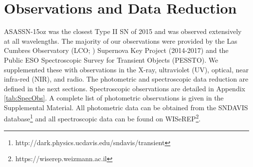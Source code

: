 \documentclass[a4paper,fleqn,usenatbib]{mnras}
\begin{document}
\section{Observations and Data Reduction}  \label{sec:Obs}
ASASSN-15oz was the closest Type II SN of 2015 and was observed extensively at all wavelengths. 
The majority of our observations were provided by the Las Cumbres Observatory (LCO; \citealt{2013brown}) Supernova Key Project (2014-2017) and the Public ESO Spectroscopic Survey for Transient Objects (PESSTO). 
We supplemented these with observations in the X-ray, ultraviolet (UV), optical, near infra-red (NIR), and radio. 
The photometric and spectroscopic data reduction are defined in the next sections. 
Spectroscopic observations are detailed in Appendix \ref{tab:SpecObs}.
A complete list of photometric observations is given in the Supplemental Material. 
All photometric data can be obtained from the SNDAVIS database\footnote{http://dark.physics.ucdavis.edu/sndavis/transient} and all spectroscopic data can be found on WISeREP\footnote{https://wiserep.weizmann.ac.il}.
\end{document}
